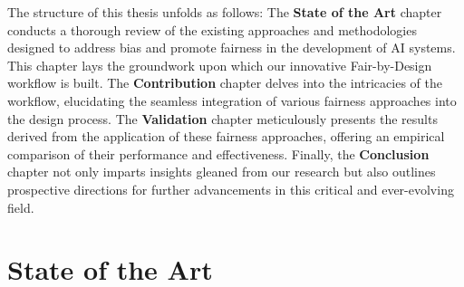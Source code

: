 \documentclass[12pt,a4paper,openright,twoside]{book}
\begin{document}
The structure of this thesis unfolds as follows: The \textbf{State of the Art} chapter conducts a thorough review of the existing approaches and methodologies designed to address bias and promote fairness in the development of AI systems. This chapter lays the groundwork upon which our innovative Fair-by-Design workflow is built. The \textbf{Contribution} chapter delves into the intricacies of the workflow, elucidating the seamless integration of various fairness approaches into the design process. The \textbf{Validation} chapter meticulously presents the results derived from the application of these fairness approaches, offering an empirical comparison of their performance and effectiveness. Finally, the \textbf{Conclusion} chapter not only imparts insights gleaned from our research but also outlines prospective directions for further advancements in this critical and ever-evolving field.

\chapter{State of the Art} %
\label{chap:background}
\end{document}
